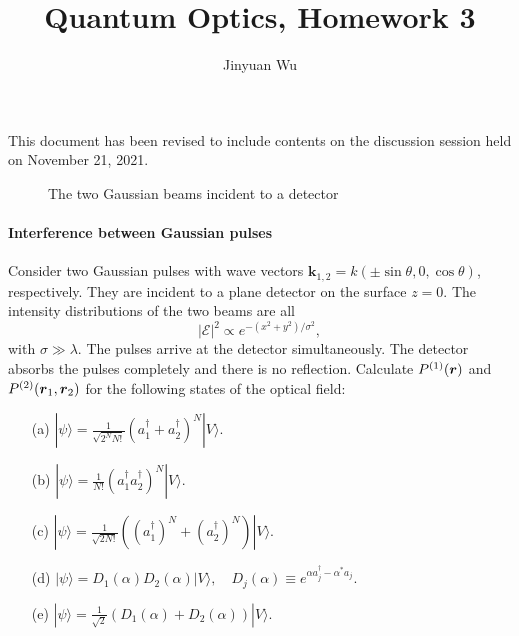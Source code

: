 \documentclass[hyperref, a4paper]{article}
\title{Quantum Optics, Homework 3}
\author{Jinyuan Wu}
\begin{document}
\maketitle

This document has been revised to include contents on the discussion session held on November 21, 2021.

\begin{figure}
    \centering
    
    \caption{The two Gaussian beams incident to a detector}
\end{figure}

\paragraph{Interference between Gaussian pulses} Consider two Gaussian pulses with wave vectors
$\boldsymbol{k}_{1,2}=k(\pm \sin \theta, 0, \cos \theta)$, respectively.
They are incident to a plane detector on the surface $z=0$. 
The intensity distributions of the two beams are all 
\begin{equation}
    |\mathcal{E}|^{2} \propto e^{-\left(x^{2}+y^{2}\right) / \sigma^{2}},
\end{equation} 
with $\sigma \gg \lambda$. The pulses arrive at the detector simultaneously.
The detector absorbs the pulses completely and there is no reflection.
Calculate $P^{(1)}(\vb*{r})$ and $P^{(2)}(\vb*{r}_1, \vb*{r}_2)$ for the following states of the optical field: 
\begin{itemize}
    \item[(a)] $|\psi\rangle=\frac{1}{\sqrt{2^{N} N !}}\left(a_{1}^\dagger+a_{2}^\dagger\right)^{N}|V\rangle$.
    \item[(b)] $|\psi\rangle=\frac{1}{N !}\left(a_{1}^\dagger a_{2}^\dagger\right)^{N}|V\rangle$.
    \item[(c)] $|\psi\rangle=\frac{1}{\sqrt{2 N !}}\left(\left(a_{1}^\dagger\right)^{N}+\left(a_{2}^\dagger\right)^{N}\right)|V\rangle$.
    \item[(d)] $|\psi\rangle=D_{1}(\alpha) D_{2}(\alpha)|V\rangle, \quad D_{j}(\alpha) \equiv e^{\alpha a_{j}^\dagger-\alpha^{*} a_{j}}$.
    \item[(e)] $|\psi\rangle=\frac{1}{\sqrt{2}}\left(D_{1}(\alpha)+D_{2}(\alpha)\right)|V\rangle$.
\end{itemize}
\end{document}
